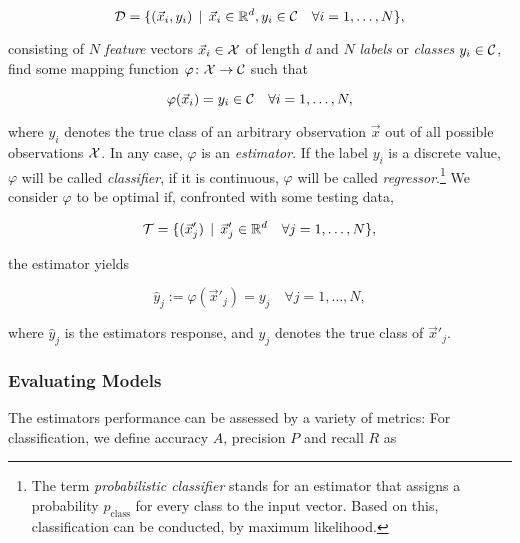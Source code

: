 \begin{equation}
\mathcal{D} = \{ (\vec x_i, y_i) \, \mid \, \vec x_i \in \mathbb{R}^d, y_i \in \mathcal{C} \quad \forall i = 1,\ldots,N \},
\end{equation}

consisting of $N$ \emph{feature} vectors $\vec x_i \in \mathcal{X}$ of length $d$ and $N$ \emph{labels} or \emph{classes} $y_i \in \mathcal{C}$, find some mapping function $\varphi \colon \mathcal{X} \to \mathcal{C}$ such that

\begin{equation}
\varphi(\vec x_i) = y_i \in \mathcal{C} \quad \forall i = 1,\ldots,N,
\end{equation}

where $y_i$ denotes the true class of an arbitrary observation $\vec x$ out of all possible observations $\mathcal{X}$. In any case, $\varphi$ is an \emph{estimator}. If the label $y_i$ is a discrete value, $\varphi$ will be called \emph{classifier}, if it is continuous, $\varphi$ will be called \emph{regressor}.\footnote{The term \emph{probabilistic classifier} stands for an estimator that assigns a probability $p_{\text{class}}$ for every class to the input vector. Based on this, classification can be conducted, \eg by maximum likelihood.} We consider $\varphi$ to be optimal if, confronted with some testing data,

\begin{equation}
\mathcal{T} = \{ (\vec x'_j) \, \mid \, \vec x'_j \in \mathbb{R}^d \quad \forall j = 1,\ldots,N \},
\end{equation}

the estimator yields

\begin{equation}
\hat y_j := \varphi({\vec x'_j}) = y_j \quad \forall j = 1,\ldots,N,
\end{equation}

where $\hat y_j$ is the estimators response, and $y_j$ denotes the true class of $\vec x'_j$.

\subsubsection{Evaluating Models}


The estimators performance can be assessed by a variety of metrics: For classification, we define accuracy $A$, precision $P$ and recall $R$ as

